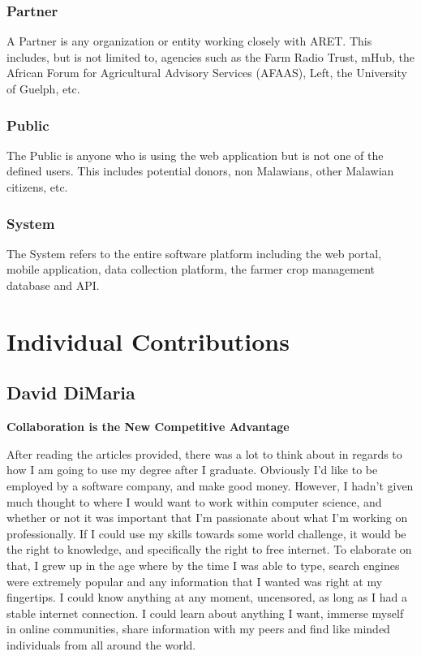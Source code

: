 \documentclass[12pt,letterpaper]{article}
\begin{document}
\subsubsection*{Partner}
A Partner is any organization or entity working closely with ARET. This includes, but is not limited to, agencies such as the Farm Radio Trust, mHub, the African Forum for Agricultural Advisory Services (AFAAS), Left, the University of Guelph, etc.

\subsubsection*{Public}
The Public is anyone who is using the web application but is not one of the defined users. This includes potential donors, non Malawians, other Malawian citizens, etc.

\subsubsection*{System}
The System refers to the entire software platform including the web portal, mobile application, data collection platform, the farmer crop management database and API.


\clearpage
\section{Individual Contributions}
\clearpage
\subsection{David DiMaria}
\textbf{Collaboration is the New Competitive Advantage}

After reading the articles provided, there was a lot to think about in regards to how I am going to use my degree after I graduate. Obviously I’d like to be employed by a software company, and make good money. However, I hadn’t given much thought to where I would want to work within computer science, and whether or not it was important that I’m passionate about what I’m working on professionally. If I could use my skills towards some world challenge, it would be the right to knowledge, and specifically the right to free internet. To elaborate on that, I grew up in the age where by the time I was able to type, search engines were extremely popular and any information that I wanted was right at my fingertips. I could know anything at any moment, uncensored, as long as I had a stable internet connection. I could learn about anything I want, immerse myself in online communities, share information with my peers and find like minded individuals from all around the world.\par
\end{document}
